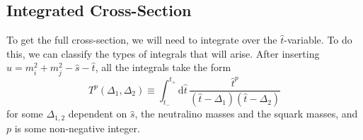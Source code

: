 \documentclass[../main.tex]{subfiles}
\begin{document}
\subsection{Integrated Cross-Section}
To get the full cross-section, we will need to integrate over the \(\hat{t}\)-variable.
To do this, we can classify the types of integrals that will arise.
After inserting \(\hat{u} = m_i^2 + m_j^2 - \hat{s} - \hat{t}\), all the integrals take the form
\begin{equation}
  T^p(\Delta_1, \Delta_2) \equiv \int_{t_-}^{t_+} \!\mathrm{d}\hat{t}\,
  \frac{\hat{t}^p}{(\hat{t}-\Delta_1)(\hat{t}-\Delta_2)}
\end{equation}
for some \(\Delta_{1,2}\) dependent on \(\hat{s}\), the neutralino masses and
the squark masses, and \(p\) is some non-negative integer.
\end{document}
